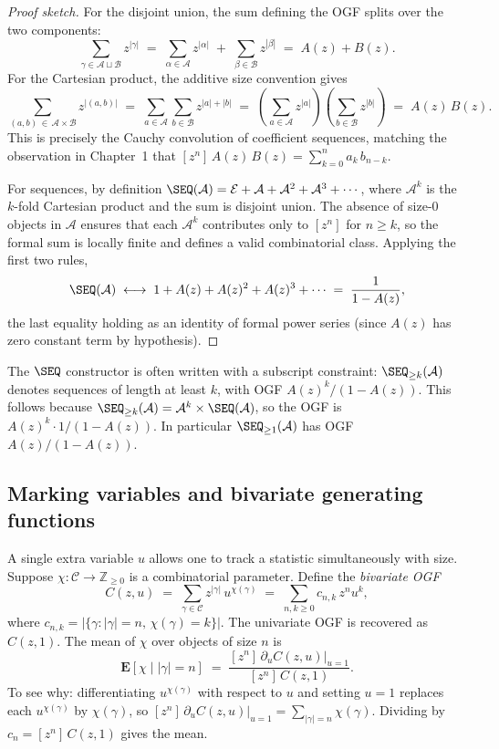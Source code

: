 \begin{proof}[Proof sketch]
For the disjoint union, the sum defining the OGF splits over the two components:
\[
  \sum_{\gamma \in \mathcal{A} \sqcup \mathcal{B}} z^{|\gamma|}
  \;=\;
  \sum_{\alpha \in \mathcal{A}} z^{|\alpha|}
  \;+\;
  \sum_{\beta \in \mathcal{B}} z^{|\beta|}
  \;=\; A(z) + B(z).
\]
For the Cartesian product, the additive size convention gives
\[
  \sum_{(a,b)\, \in\, \mathcal{A} \times \mathcal{B}} z^{|(a,b)|}
  \;=\;
  \sum_{a \in \mathcal{A}} \sum_{b \in \mathcal{B}} z^{|a| + |b|}
  \;=\;
  \left(\sum_{a \in \mathcal{A}} z^{|a|}\right)
  \left(\sum_{b \in \mathcal{B}} z^{|b|}\right)
  \;=\; A(z)\,B(z).
\]
This is precisely the Cauchy convolution of coefficient sequences, matching the
observation in Chapter~1 that $[z^n]\,A(z)\,B(z) = \sum_{k=0}^n a_k\,b_{n-k}$.

For sequences, by definition
$\SEQ(\mathcal{A}) = \mathcal{E} + \mathcal{A} + \mathcal{A}^2 + \mathcal{A}^3 +
\cdots$, where $\mathcal{A}^k$ is the $k$-fold Cartesian product and the sum is
disjoint union.  The absence of size-$0$ objects in $\mathcal{A}$ ensures that
each $\mathcal{A}^k$ contributes only to $[z^n]$ for $n \ge k$, so the formal
sum is locally finite and defines a valid combinatorial class.  Applying the first
two rules,
\[
  \SEQ(\mathcal{A})
  \;\longleftrightarrow\;
  1 + A(z) + A(z)^2 + A(z)^3 + \cdots
  \;=\; \frac{1}{1 - A(z)},
\]
the last equality holding as an identity of formal power series (since $A(z)$ has
zero constant term by hypothesis).
\end{proof}

\begin{remark}
The $\SEQ$ constructor is often written with a subscript constraint:
$\SEQ_{\ge k}(\mathcal{A})$ denotes sequences of length at least $k$, with OGF
$A(z)^k/(1 - A(z))$.  This follows because $\SEQ_{\ge k}(\mathcal{A}) =
\mathcal{A}^k \times \SEQ(\mathcal{A})$, so the OGF is $A(z)^k \cdot 1/(1-A(z))$.
In particular $\SEQ_{\ge 1}(\mathcal{A})$ has OGF $A(z)/(1-A(z))$.
\end{remark}

\subsection*{Marking variables and bivariate generating functions}

A single extra variable $u$ allows one to track a statistic simultaneously with
size.  Suppose $\chi : \mathcal{C} \to \mathbb{Z}_{\ge 0}$ is a combinatorial
parameter.  Define the \emph{bivariate OGF}
\[
  C(z,u) \;=\; \sum_{\gamma \in \mathcal{C}} z^{|\gamma|}\, u^{\chi(\gamma)}
            \;=\; \sum_{n,k \ge 0} c_{n,k}\, z^n u^k,
\]
where $c_{n,k} = |\{\gamma : |\gamma| = n,\, \chi(\gamma) = k\}|$.  The
univariate OGF is recovered as $C(z,1)$.  The mean of $\chi$ over objects of size
$n$ is
\[
  \mathbf{E}[\chi \mid |\gamma| = n]
  \;=\; \frac{[z^n]\,\partial_u C(z,u)\big|_{u=1}}{[z^n]\,C(z,1)}.
\]
To see why: differentiating $u^{\chi(\gamma)}$ with respect to $u$ and setting
$u = 1$ replaces each $u^{\chi(\gamma)}$ by $\chi(\gamma)$, so
$[z^n]\,\partial_u C(z,u)|_{u=1} = \sum_{|\gamma|=n} \chi(\gamma)$.
Dividing by $c_n = [z^n]\,C(z,1)$ gives the mean.


